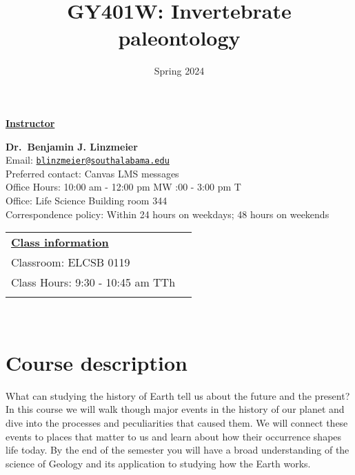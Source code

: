 \documentclass[11pt,]{article}
\title{GY401W: Invertebrate paleontology}
\date{Spring 2024}
\begin{document}
  

		\maketitle
		
	
		\thispagestyle{firststyle}

\textbf{\underline{Instructor}}
\begin{multicols}{2}

  \textbf{Dr.~Benjamin J. Linzmeier}\\
  Email: \href{mailto:blinzmeier@southalabama.edu}{\nolinkurl{blinzmeier@southalabama.edu}}\\
  Preferred contact: Canvas LMS messages\\
  Office Hours: 10:00 am - 12:00 pm MW :00 - 3:00 pm T\\
  Office: Life Science Building room 344\\
  Correspondence policy: Within 24 hours on weekdays; 48 hours on
weekends\\
    \columnbreak
    
  \end{multicols}
	
\noindent \begin{tabular*}{\textwidth}{ @{\extracolsep{\fill}} lr @{\extracolsep{\fill}}}
\textbf{\underline{Class information}}\\
  Classroom: ELCSB 0119\\
  Class Hours: 9:30 - 10:45 am TTh\\
    \\
	\end{tabular*}\\


\vspace{2mm}


\hypertarget{course-description}{%
\section{Course description}\label{course-description}}

What can studying the history of Earth tell us about the future and the
present? In this course we will walk though major events in the history
of our planet and dive into the processes and peculiarities that caused
them. We will connect these events to places that matter to us and learn
about how their occurrence shapes life today. By the end of the semester
you will have a broad understanding of the science of Geology and its
application to studying how the Earth works.
\end{document}
